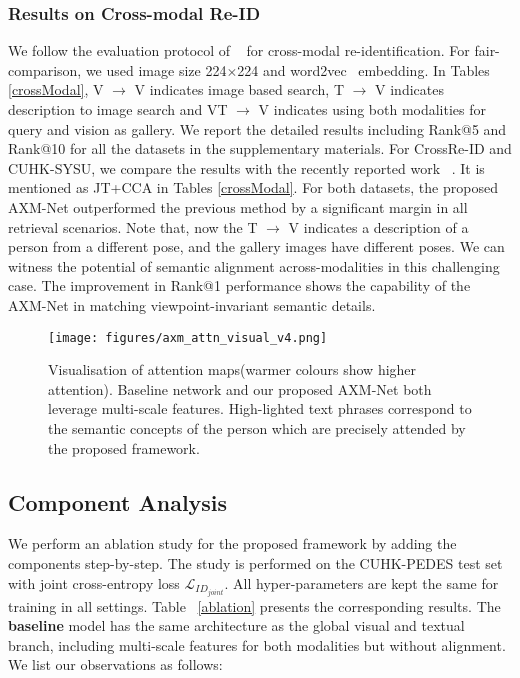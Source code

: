 \documentclass[letterpaper]{article} \usepackage{aaai22}  \usepackage{times}  \usepackage{helvet}  \usepackage{courier}  \usepackage[hyphens]{url}  \usepackage{graphicx} \urlstyle{rm} \def\UrlFont{\rm}  \usepackage{natbib}  \usepackage{caption} \DeclareCaptionStyle{ruled}{labelfont=normalfont,labelsep=colon,strut=off} \frenchspacing  \setlength{\pdfpagewidth}{8.5in}  \setlength{\pdfpageheight}{11in}  \usepackage{algorithm}
\begin{document}
\subsubsection{Results on Cross-modal Re-ID}
We follow the evaluation protocol of ~\cite{farooq2020IJCB} for cross-modal re-identification. For fair-comparison, we used image size 224$\times$224 and word2vec~\cite{mikolov2013distributed} embedding. In Tables \ref{crossModal}, V $\xrightarrow{}$ V indicates image based search, T $\xrightarrow{}$ V indicates description to image search and VT $\xrightarrow{}$ V indicates using both modalities for query and vision as gallery. We report the detailed results including Rank@5 and Rank@10 for all the datasets in the supplementary materials.
For CrossRe-ID and CUHK-SYSU, we compare the results with the recently reported work ~\cite{farooq2020IJCB}. It is mentioned as JT+CCA in Tables \ref{crossModal}. For both datasets, the proposed AXM-Net outperformed the previous method by a significant margin in all retrieval scenarios. Note that, now the  T $\xrightarrow{}$ V indicates a description of a person from a different pose, and the gallery images have different poses. We can witness the potential of semantic alignment across-modalities in this challenging case. The improvement in Rank@1 performance shows the capability of the AXM-Net in matching viewpoint-invariant semantic details. 


\begin{figure*}[!htbp]
\centering
        \texttt{[image: figures/axm\_attn\_visual\_v4.png]}
        \caption{Visualisation of attention maps(warmer colours show higher attention). Baseline network and our proposed AXM-Net both leverage multi-scale features. High-lighted text phrases correspond to the semantic concepts of the person which are precisely attended by the proposed framework.}
    \label{attn_visual}
\end{figure*}

\subsection{Component Analysis}
We perform an ablation study for the proposed framework by adding the components step-by-step. The study is performed on the CUHK-PEDES test set with joint cross-entropy loss $\mathcal{L}_{ID_{joint}}$. All hyper-parameters are kept the same for training in all settings. Table ~\ref{ablation} presents the corresponding results. The \textbf{baseline} model has the same architecture as the global visual and textual branch, including multi-scale features for both modalities but without alignment. We list our observations as follows:
\end{document}
